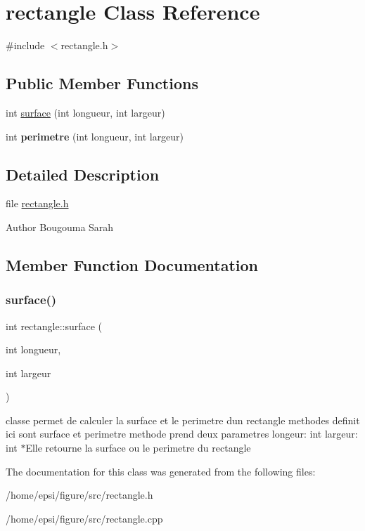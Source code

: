 \hypertarget{classrectangle}{}\section{rectangle Class Reference}
\label{classrectangle}


{\ttfamily \#include $<$rectangle.\+h$>$}

\subsection*{Public Member Functions}
\begin{DoxyCompactItemize}
\item 
int \hyperlink{classrectangle_a5923870fc20835f463cde0f64023b042}{surface} (int longueur, int largeur)
\item 
\mbox{\label{classrectangle_aa613ad02ccb6dac181af4da6582315e6}} 
int {\bfseries perimetre} (int longueur, int largeur)
\end{DoxyCompactItemize}


\subsection{Detailed Description}
file \hyperlink{rectangle_8h_source}{rectangle.\+h} \begin{DoxyAuthor}{Author}
Bougouma Sarah 
\end{DoxyAuthor}


\subsection{Member Function Documentation}
\mbox{\label{classrectangle_a5923870fc20835f463cde0f64023b042}} 
\subsubsection{\texorpdfstring{surface()}{surface()}}
{\footnotesize\ttfamily int rectangle\+::surface (\begin{DoxyParamCaption}\item[{int}]{longueur,  }\item[{int}]{largeur }\end{DoxyParamCaption})}

classe permet de calculer la surface et le perimetre d\textquotesingle{}un rectangle  methodes definit ici sont surface et perimetre  methode prend deux parametres longeur\+: int largeur\+: int $\ast$\+Elle retourne la surface ou le perimetre du rectangle 

The documentation for this class was generated from the following files\+:\begin{DoxyCompactItemize}
\item 
/home/epsi/figure/src/rectangle.\+h\item 
/home/epsi/figure/src/rectangle.\+cpp\end{DoxyCompactItemize}
